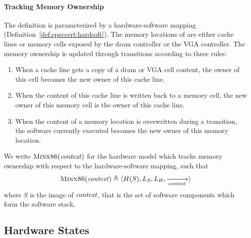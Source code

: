 \paragraph{Tracking Memory Ownership}
%
The  definition is parameterized by a hardware-software
mapping  (Definition~\ref{def:speccert:hardsoft}).
%
The memory locations of  are either cache lines or memory
cells exposed by the \ac{dram} controller or the VGA controller.
%
The memory ownership is updated through transitions according to three rules:
%
\begin{enumerate}
\item When a cache line gets a copy of a \ac{dram} or VGA cell content, the
  owner of this cell becomes the new owner of this cache line.
%
\item When the content of this cache line is written back to a memory cell, the
  new owner of this memory cell is the owner of this cache line.
%
\item When the content of a memory location is overwritten during a transition,
  the software currently executed becomes the new owner of this memory location.
%
\end{enumerate}


\begin{definition}
  \label{def:speccert2:minx86}
  We write $\textsc{Minx86}(\mathit{context})$ for the hardware model which
  tracks memory ownership with respect to the  hardware-software
  mapping, such that
%
  \[
    \textsc{Minx86}(\mathit{context}) \triangleq \langle H(S), L_S, L_H,
    \xrightarrow[\mathit{context}]{} \rangle
  \]
  where $S$ is the image of $\mathit{context}$, that is the set of software
  components which form the software stack.
\end{definition}


\subsection{Hardware States}

